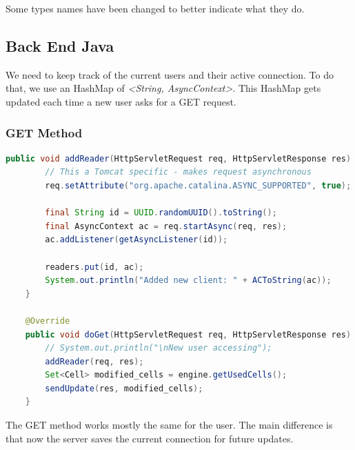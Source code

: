 \documentclass[12pt, a4paper]{article}
\begin{document}
  Some types names have been changed to better indicate what they do.

  \pagebreak
  \subsection{Back End Java}
  We need to keep track of the current users and their active connection. To do that, we use an HashMap of \textit{<String, AsyncContext>}. This HashMap gets updated each time a new user asks for a GET request.

  \subsubsection{GET Method}
  \begin{lstlisting}[language=java, caption={GET route, second version}]
    public void addReader(HttpServletRequest req, HttpServletResponse res) {
        // This a Tomcat specific - makes request asynchronous
        req.setAttribute("org.apache.catalina.ASYNC_SUPPORTED", true);

        final String id = UUID.randomUUID().toString();
        final AsyncContext ac = req.startAsync(req, res);
        ac.addListener(getAsyncListener(id));

        readers.put(id, ac);
        System.out.println("Added new client: " + ACToString(ac));
    } 

    @Override
    public void doGet(HttpServletRequest req, HttpServletResponse res) throws IOException {
        // System.out.println("\nNew user accessing");
        addReader(req, res);
        Set<Cell> modified_cells = engine.getUsedCells();
        sendUpdate(res, modified_cells);
    }
  \end{lstlisting}

  The GET method works mostly the same for the user. The main difference is that now the server saves the current connection for future updates.

  \pagebreak
\end{document}
